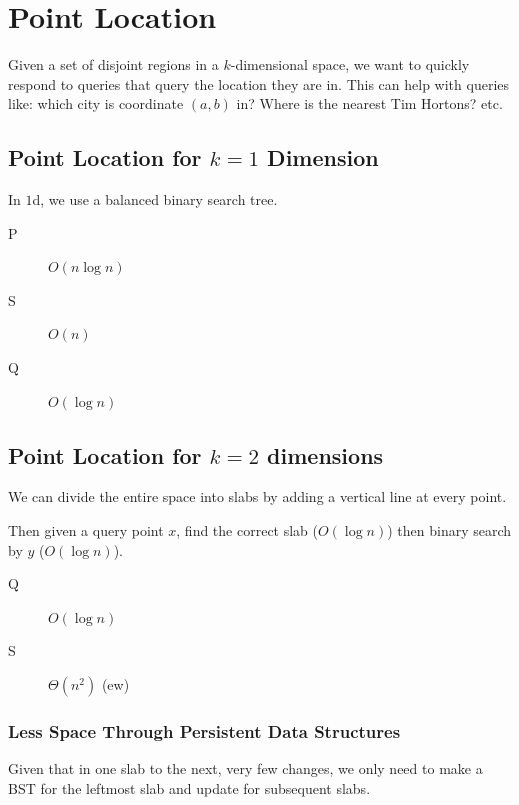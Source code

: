             \section{Point Location} %
            \label{sec:point_location}
                Given a set of disjoint regions in a $k$-dimensional space, we want to quickly respond to queries that query the location they are in.
                This can help with queries like: which city is coordinate $(a,b)$ in?
                Where is the nearest Tim Hortons?
                etc.

                \subsection{Point Location for $k=1$ Dimension} %
                \label{sub:point_location_for_k_1_dimension}
                    In $1$d, we use a balanced binary search tree.
                    \begin{description}
                        \item[P] $O(n \log n)$
                        \item[S] $O(n)$
                        \item[Q] $O(\log n)$
                    \end{description}
                \subsection{Point Location for $k=2$ dimensions} %
                \label{sub:point_location_for_k_2_dimensions}
                    We can divide the entire space into slabs by adding a vertical line at every point.

                    Then given a query point $x$, find the correct slab ($O(\log n)$) then binary search by $y$ ($O(\log n)$).
                    \begin{description}
                        \item[Q] $O(\log n)$
                        \item[S] $\Theta(n^2)$ (ew)
                    \end{description}
                    \subsubsection{Less Space Through Persistent Data Structures} %
                    \label{ssub:less_space_through_persistent_data_structures}
                        Given that in one slab to the next, very few changes, we only need to make a BST for the leftmost slab and update for subsequent slabs.

